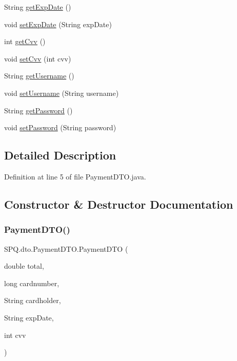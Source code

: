 \begin{DoxyCompactItemize}
String \mbox{\hyperlink{class_s_p_q_1_1dto_1_1_payment_d_t_o_aa91402a8c96a306fcf125973e4f35912}{get\+Exp\+Date}} ()
\item 
void \mbox{\hyperlink{class_s_p_q_1_1dto_1_1_payment_d_t_o_a6d3d88f07321648bc17e385432ee9044}{set\+Exp\+Date}} (String exp\+Date)
\item 
int \mbox{\hyperlink{class_s_p_q_1_1dto_1_1_payment_d_t_o_a64fb9df59333fcc2a0c8bea48024354d}{get\+Cvv}} ()
\item 
void \mbox{\hyperlink{class_s_p_q_1_1dto_1_1_payment_d_t_o_aee98ca86c3d7e05f98e387faa4f5a3d4}{set\+Cvv}} (int cvv)
\item 
String \mbox{\hyperlink{class_s_p_q_1_1dto_1_1_payment_d_t_o_a31d0edbb3ec64b406e70cd3deaa5ab1a}{get\+Username}} ()
\item 
void \mbox{\hyperlink{class_s_p_q_1_1dto_1_1_payment_d_t_o_aaad1620f8f86cb26566476c22bfcd3af}{set\+Username}} (String username)
\item 
String \mbox{\hyperlink{class_s_p_q_1_1dto_1_1_payment_d_t_o_ae012449dd0baea7f169bb64dcf973dec}{get\+Password}} ()
\item 
void \mbox{\hyperlink{class_s_p_q_1_1dto_1_1_payment_d_t_o_a51a5daa487df2578ca39ede7ae705fb6}{set\+Password}} (String password)
\end{DoxyCompactItemize}


\subsection{Detailed Description}


Definition at line 5 of file Payment\+D\+T\+O.\+java.



\subsection{Constructor \& Destructor Documentation}
\mbox{\label{class_s_p_q_1_1dto_1_1_payment_d_t_o_a4a6f91d0976ce0af97a8f7f15658294c}} 
\subsubsection{\texorpdfstring{Payment\+D\+T\+O()}{PaymentDTO()}\hspace{0.1cm}{\footnotesize\ttfamily [1/6]}}
{\footnotesize\ttfamily S\+P\+Q.\+dto.\+Payment\+D\+T\+O.\+Payment\+D\+TO (\begin{DoxyParamCaption}\item[{double}]{total,  }\item[{long}]{cardnumber,  }\item[{String}]{cardholder,  }\item[{String}]{exp\+Date,  }\item[{int}]{cvv }\end{DoxyParamCaption})}



